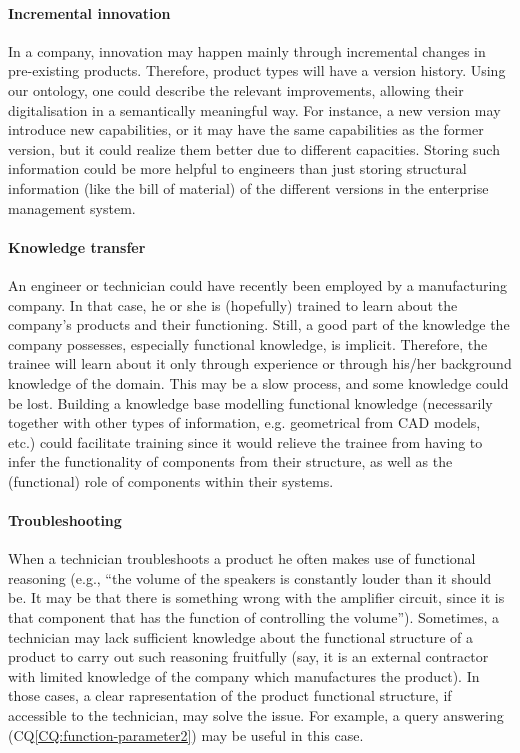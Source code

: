 \documentclass[sw]{iosart2x}
\newcommand{\CQLabel}{\textrm{CQ}}
\newcommand{\refCQ}[1]{({\CQLabel}\ref{#1})}
\newcommand{\qquotes}[1]{``#1''}
\begin{document}
\paragraph{Incremental innovation} In a company, innovation may happen mainly through incremental changes in pre-existing products. 
Therefore, product types will have a version history. 
Using our ontology, one could describe 
the relevant improvements, allowing their digitalisation in a semantically meaningful way. 
For instance, a new version may introduce new capabilities, or it may have the same capabilities as the former version, but it could realize them better due to different capacities. 
Storing such information could be more helpful to engineers than just storing structural information (like the bill of material) of the different versions in the enterprise management system.

\paragraph{Knowledge transfer} An engineer or technician could have recently been employed by a manufacturing company. 
In that case, he or she is (hopefully) trained to learn about the company's products and their functioning. 
Still, a good part of the knowledge the company possesses, especially functional knowledge, is implicit. 
Therefore, the trainee will learn about it only through experience or through his/her background knowledge of the domain. 
This may be a slow process, and some knowledge could be lost. 
Building a knowledge base modelling functional knowledge (necessarily together with other types of information, e.g. geometrical from CAD models, etc.) could facilitate training since it would relieve the trainee from having to infer the functionality of components from their structure, as well as the (functional) role of components within their systems. 

\paragraph{Troubleshooting} When a technician troubleshoots a product he often makes use of functional reasoning (e.g., \qquotes{the volume of the speakers is constantly louder than it should be. It may be that there is something wrong with the amplifier circuit, since it is that component that has the function of controlling the volume}). 
Sometimes, a technician may lack sufficient knowledge about the functional structure of a product to carry out such reasoning fruitfully (say, it is an external contractor with limited knowledge of the company which manufactures the product). 
In those cases, a clear rapresentation of the product functional structure, if accessible to the technician, may solve the issue.
For example, a query answering \refCQ{CQ:function-parameter2} may be useful in this  case.
\end{document}
